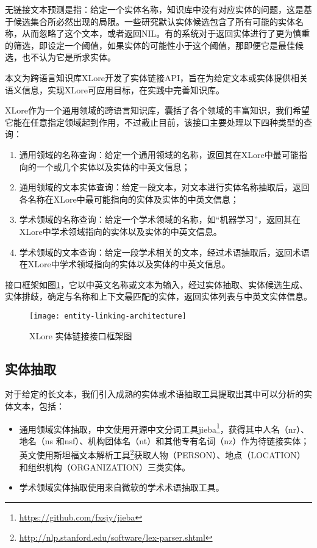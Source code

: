 {\heiti 无链接文本预测}是指：给定一个实体名称，知识库中没有对应实体的问题，这是基于候选集合所必然出现的局限。一些研究默认实体候选包含了所有可能的实体名称，从而忽略了这个文本\cite{kulkarni2009collective,shen2012liege}，或者返回NIL\cite{varma2009iiit}。有的系统对于返回实体进行了更为慎重的筛选，即设定一个阈值，如果实体的可能性小于这个阈值，那即便它是最佳候选，也不认为它是所求实体\cite{han2009nlpr_kbp,lehmann2010lcc,han2011generative}。

本文为跨语言知识库XLore开发了实体链接API，旨在为给定文本或实体提供相关语义信息，实现XLore可应用目标，在实践中完善知识库。


XLore作为一个通用领域的跨语言知识库，囊括了各个领域的丰富知识，我们希望它能在任意指定领域起到作用，不过截止目前，该接口主要处理以下四种类型的查询：
\begin{enumerate}[1.]
\item 通用领域的名称查询：给定一个通用领域的名称，返回其在XLore中最可能指向的一个或几个实体以及实体的中英文信息；
\item 通用领域的文本实体查询：给定一段文本，对文本进行实体名称抽取后，返回各名称在XLore中最可能指向的实体及实体的中英文信息；
\item 学术领域的名称查询：给定一个学术领域的名称，如“机器学习”，返回其在XLore中学术领域指向的实体以及实体的中英文信息。
\item 学术领域的文本查询：给定一段学术相关的文本，经过术语抽取后，返回术语在XLore中学术领域指向的实体以及实体的中英文信息。
\end{enumerate}

接口框架如图\ref{fig:entity-linking-architecture}，它以中英文名称或文本为输入，经过实体抽取、实体候选生成、实体排歧，确定与名称和上下文最匹配的实体，返回实体列表与中英文实体信息。
\begin{figure}[ht]
  \centering
  \texttt{[image: entity-linking-architecture]}
  \caption{XLore 实体链接接口框架图}
  \label{fig:entity-linking-architecture}
\end{figure}

\subsection{实体抽取}
对于给定的长文本，我们引入成熟的实体或术语抽取工具提取出其中可以分析的实体文本，包括：
\begin{itemize}
\item 通用领域实体抽取，中文使用开源中文分词工具jieba\footnote{\url{https://github.com/fxsjy/jieba}}，获得其中人名（nr）、地名（ns 和nsf）、机构团体名（nt）和其他专有名词（nz）作为待链接实体；英文使用斯坦福文本解析工具\footnote{\url{http://nlp.stanford.edu/software/lex-parser.shtml}}获取人物（PERSON）、地点（LOCATION）和组织机构（ORGANIZATION）三类实体。
\item 学术领域实体抽取使用来自微软的学术术语抽取工具。
\end{itemize}

